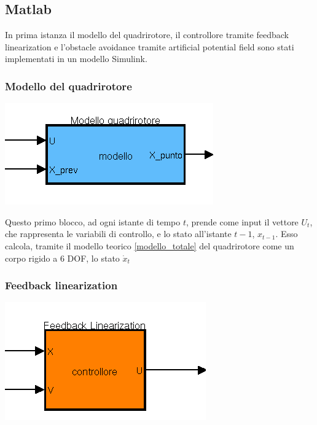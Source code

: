 \documentclass[a4paper,10pt]{article}
\begin{document}
\subsection{Matlab}

In prima istanza il modello del quadrirotore, il controllore tramite feedback linearization e l'obstacle avoidance tramite artificial potential field sono stati implementati in un modello Simulink.

\subsubsection{Modello del quadrirotore}

\begin{center}
\includegraphics[scale=0.5]{img/quad_model.png} 
\end{center}

Questo primo blocco, ad ogni istante di tempo $t$, prende come input il vettore $U_t$, che rappresenta le variabili di controllo, e lo stato all'istante $t-1$, $x_{t-1}$.  Esso calcola, tramite il modello teorico \ref{modello_totale} del quadrirotore come un corpo rigido a 6 DOF, lo stato $\dot{x}_t$

\subsubsection{Feedback linearization}
\begin{center}
\includegraphics[scale=0.5]{img/feedback.png} 
\end{center}
\end{document}
